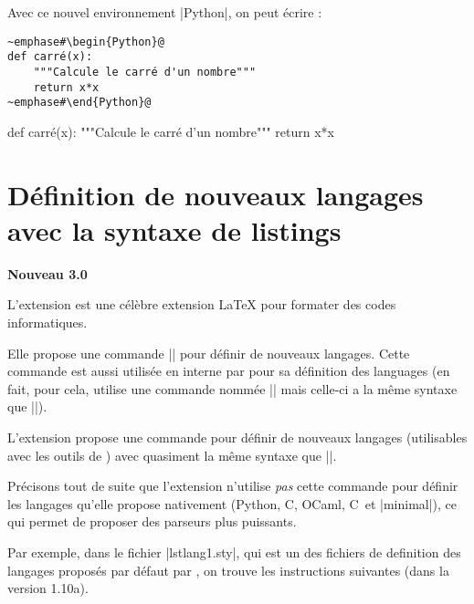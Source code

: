 \documentclass[dvipsnames,svgnames]{article}
\def\CC{{C\nolinebreak[4]\hspace{-.05em}\raisebox{.4ex}{\tiny\bfseries ++}}}
\begin{document}
\bigskip
Avec ce nouvel environnement |{Python}|, on peut écrire : 

\begin{Verbatim}
~emphase#\begin{Python}@
def carré(x):
    """Calcule le carré d'un nombre"""
    return x*x
~emphase#\end{Python}@
\end{Verbatim}

  {\begin{tcolorbox}}
  {\end{tcolorbox}}

\begin{Python}
def carré(x):
    """Calcule le carré d'un nombre"""
    return x*x
\end{Python}

\section{Définition de nouveaux langages avec la syntaxe de listings}

\label{NewPitonLanguage}

\colorbox{yellow!50}{\textbf{Nouveau 3.0}}

\medskip
L'extension  est une célèbre extension LaTeX pour formater des codes informatiques.  

\medskip
Elle propose une commande |\lstdefinelanguage| pour définir de nouveaux langages. Cette commande est aussi
utilisée en interne par  pour sa définition des languages (en fait, pour cela,  utilise
une commande nommée |\lst@definelanguage| mais celle-ci a la même syntaxe que |\lstdefinelanguage|).

\medskip
L'extension  propose une commande  pour définir de nouveaux
langages (utilisables avec les outils de ) avec quasiment la même syntaxe que |\lstdefinelanguage|.

\medskip
Précisons tout de suite que l'extension  n'utilise \emph{pas} cette commande pour définir les langages
qu'elle propose nativement (Python, C, OCaml, \CC\ et |minimal|), ce qui permet de proposer des parseurs plus puissants.

\medskip
Par exemple, dans le fichier |lstlang1.sty|, qui est un des fichiers de definition des langages proposés par défaut
par , on trouve les instructions suivantes (dans la version 1.10a).
\end{document}
